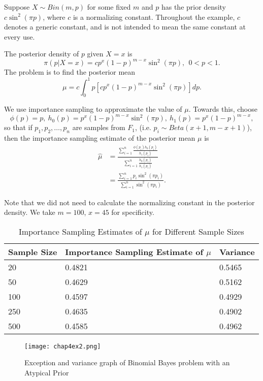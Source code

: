 \begin{example}
	\label{Binomial Bayes problem with an Atypical Prior}
	Suppose $X\sim Bin(m,p)$ for some fixed $m$ and $p$ has the prior density $c\sin^{2}(\pi p)$,
	where $c$ is a normalizing constant.
	Throughout the example, $c$ denotes a generic constant,
	and is not intended to mean the same constant at every use.

	The posterior density of $p$ given $X = x$ is
	\[
		\pi(p|X=x) = cp^{x}(1-p)^{m-x}\sin ^{2}(\pi p), \ \ 0<p<1.
	\]
	The problem is to find the posterior mean
	\[
		\mu = c \int_{0}^{1} p[cp^{x}(1-p)^{m-x}\sin ^{2}(\pi p)]dp.
	\]

	We use importance sampling to approximate the value of $\mu$. Towards this, choose
	\[
		\phi(p)=p, \ h_0(p) = p^{x} (1-p)^{m-x} \sin ^{2}(\pi p),\ h_1(p) = p^{x}(1-p)^{m-x},
	\]
	so that if $p_1,p_2,\ldots,p_n$ are samples from $F_1$, (i.e. $p_i\sim Beta(x+1, m-x+1)$),
	then the importance sampling estimate of the posterior mean $\mu$ is
	\begin{align*}
		\hat{\mu} & = \frac{\sum_{i=1}^{n}\frac{\phi(p_i)h_0(p_i)}{h_1(p_i)} }{\sum_{i=1}^{n}\frac{h_0(p_i)}{h_1(p_i)} } \\
		          & = \frac{\sum_{i=1}^{n}p_i\sin ^{2}(\pi p_i) }{\sum_{i=1}^{n} \sin ^{2}(\pi p_i) }.
	\end{align*}

	Note that we did not need to calculate the normalizing constant in the posterior density.
	We take $m=100$, $x=45$ for specificity.
	\begin{table}[H]
		\centering
		\begin{tabular}{l p{3.5cm} p{2cm}}
			\hline
			Sample Size & Importance Sampling Estimate of $\mu$ & Variance \\
			\hline
			20          & 0.4821                                & 0.5465   \\
			50          & 0.4629                                & 0.5162   \\
			100         & 0.4597                                & 0.4929   \\
			250         & 0.4635                                & 0.4902   \\
			500         & 0.4585                                & 0.4962   \\
			\hline
		\end{tabular}
		\caption{Importance Sampling Estimates of $\mu$ for Different Sample Sizes}
		\label{tab:importance-sampling-mu}
	\end{table}
    \begin{figure}[H]
        \centering
        \texttt{[image: chap4ex2.png]}
        \caption{Exception and variance graph of Binomial Bayes problem with an Atypical Prior}
    \end{figure}
\end{example}

